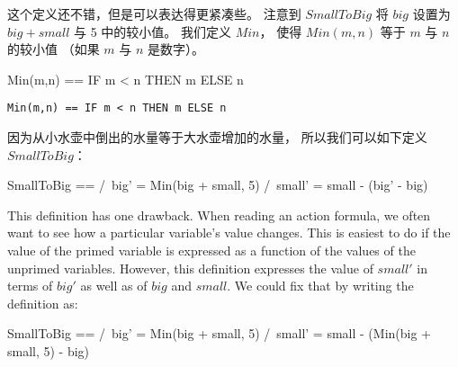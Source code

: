 \begin{ch}
  这个定义还不错，但是可以表达得更紧凑些。
  注意到 $SmallToBig$ \tlastep{} 将 $big$ 设置为 $big+small$ 与 5 中的较小值。
  我们定义 $Min$， 使得 $Min(m,n)$ 等于 $m$ 与 $n$ 的较小值
  （如果 $m$ 与 $n$ 是数字）。
  \begin{twocols}
  \begin{notla}
  Min(m,n) == IF m < n THEN m ELSE n
  \end{notla}
  \begin{tlatex}
  \end{tlatex}
  \midcol
  \verb|Min(m,n) == IF m < n THEN m ELSE n|
  \end{twocols}
  因为从小水壶中倒出的水量等于大水壶增加的水量，
  所以我们可以如下定义 $SmallToBig$：
  \begin{display}
  \begin{notla}
  SmallToBig == /\ big' = Min(big + small, 5)
		/\ small' = small - (big' - big)
  \end{notla}
  \begin{tlatex}
  \end{tlatex}
  \end{display}
\end{ch}
\begin{en}
This definition has one drawback.  When reading an action formula, we
often want to see how a particular variable's value changes.  This is
easiest to do if the value of the primed variable is expressed as a
function of the values of the unprimed variables.  However, this
definition expresses the value of $small'$ in terms of $big'$ as well
as of $big$ and $small$.  We could fix that by writing the definition as:
\begin{display}
\begin{notla}
SmallToBig == /\ big' = Min(big + small, 5)
              /\ small' = small - (Min(big + small, 5) - big)
\end{notla}
\begin{tlatex}
\end{tlatex}
\end{display}
\end{en}

